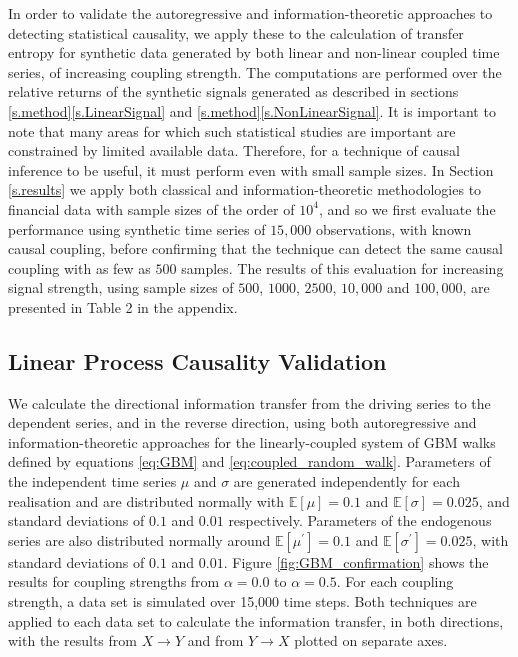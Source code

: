 \documentclass[]{rsos}%
\begin{document}
{  In order to validate the autoregressive and information-theoretic approaches to detecting statistical causality, we apply these to the calculation of transfer entropy for synthetic data generated by both linear and non-linear coupled time series, of increasing coupling strength. 
  The computations are performed over the relative returns of the synthetic signals generated as described in sections \ref{s.method}\ref{s.LinearSignal} and \ref{s.method}\ref{s.NonLinearSignal}. 
  It is important to note that many areas for which such statistical studies are important are constrained by limited available data. Therefore, for a technique of causal inference to be useful, it must perform even with small sample sizes. In Section \ref{s.results} we apply both classical and information-theoretic methodologies to financial data with sample sizes of the order of $10^4$, and so we first evaluate the performance using synthetic time series of $15,000$ observations, with known causal coupling, before confirming that the technique can detect the same causal coupling with as few as $500$ samples. The results of this evaluation for increasing signal strength, using sample sizes of $500$, $1000$, $2500$, $10,000$ and $100,000$, are presented in Table 2 in the appendix.


  \subsection{Linear Process Causality Validation} 

  We calculate the directional information transfer from the driving series to the dependent series, and in the reverse direction, using both autoregressive and information-theoretic approaches for the linearly-coupled system of GBM walks defined by equations \ref{eq:GBM} and \ref{eq:coupled_random_walk}. Parameters of the independent time series $\mu$ and $\sigma $ are generated independently for each realisation and are distributed normally with $\mathbb{E} [\mu]=0.1$ and $\mathbb{E} [\sigma]=0.025$, and standard deviations of $0.1$ and $0.01$ respectively. Parameters of the endogenous series are also distributed normally around $\mathbb{E} [\mu^{\prime}]=0.1$ and $\mathbb{E} [\sigma^{\prime}]=0.025$, with standard deviations of $0.1$ and $0.01$. Figure \ref{fig:GBM_confirmation} shows the results for coupling strengths from $\alpha = 0.0$ to $\alpha = 0.5$. For each coupling strength, a data set is simulated over 15,000 time steps. Both techniques are applied to each data set to calculate the information transfer, in both directions, with the results from $X \rightarrow Y$ and from $Y \rightarrow X$ plotted on separate axes. 

}
\end{document}
